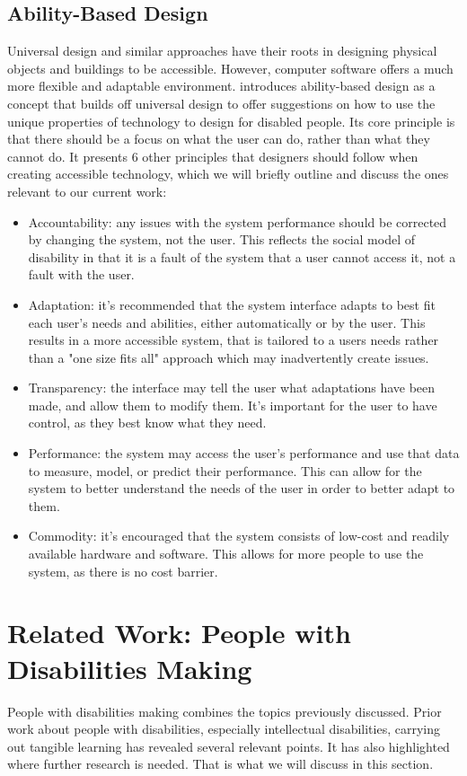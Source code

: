 \documentclass{l4proj}
\begin{document}
\subsection{Ability-Based Design}
Universal design and similar approaches have their roots in designing physical objects and buildings to be accessible. However, computer software offers a much more flexible and adaptable environment. \cite{Wob2011} introduces ability-based design as a concept that builds off universal design to offer suggestions on how to use the unique properties of technology to design for disabled people. Its core principle is that there should be a focus on what the user can do, rather than what they cannot do. It presents 6 other principles that designers should follow when creating accessible technology, which we will briefly outline and discuss the ones relevant to our current work:
\begin{itemize}
    \item Accountability: any issues with the system performance should be corrected by changing the system, not the user. This reflects the social model of disability in that it is a fault of the system that a user cannot access it, not a fault with the user.
    \item
Adaptation: it’s recommended that the system interface adapts to best fit each user's needs and abilities, either automatically or by the user. This results in a more accessible system, that is tailored to a users needs rather than a "one size fits all" approach which may inadvertently create issues. 
\item
Transparency: the interface may tell the user what adaptations have been made, and allow them to modify them. It's important for the user to have control, as they best know what they need. 
\item
Performance: the system may access the user’s performance and use that data to measure, model, or predict their performance. This can allow for the system to better understand the needs of the user in order to better adapt to them. 
\item
Commodity: it’s encouraged that the system consists of low-cost and readily available hardware and software. This allows for more people to use the system, as there is no cost barrier.
\end{itemize}



\section{Related Work: People with Disabilities Making}
People with disabilities making combines the topics previously discussed. Prior work about people with disabilities, especially intellectual disabilities, carrying out tangible learning has revealed several relevant points. It has also highlighted where further research is needed. That is what we will discuss in this section. 
\end{document}
